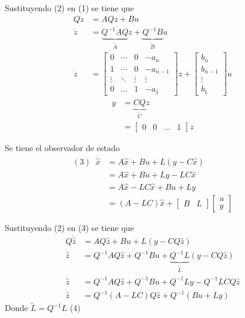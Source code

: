 Sustituyendo (2) en (1) se tiene que
\[
    \begin{split}
        Q\dot{z} & = AQz + Bu\\
        \dot{z} & = \underbrace{Q^{-1}AQ}_{\tilde{A}}z + \underbrace{Q^{-1}B}_{\tilde{B}}u\\
        \dot{z} & = 
            \begin{bmatrix}
                0 & \cdots & 0 & -a_{n} \\
                1 & \cdots & 0 & -a_{n-1} \\
                \vdots & \ddots & \vdots & \vdots \\
                0 & \ldots & 1 & -a_{1}
            \end{bmatrix} z +
            \begin{bmatrix}
                b_{n} \\ b_{n-1} \\ \vdots \\ b_{1}
            \end{bmatrix} u
    \end{split}
\]
\[
    \begin{split}
        y & = \underbrace{CQ}_{\tilde{C}}z \\
        & = \begin{bmatrix}
                0 & 0 & \ldots & 1
            \end{bmatrix} z
    \end{split}
\]

Se tiene el observador de estado
\[
    \begin{split}
        (3) \;\; \dot{\hat{x}} & = A\hat{x} + Bu + L(y-C\hat{x}) \\
        & = A\hat{x} + Bu + Ly - LC\hat{x} \\
        & = A\hat{x} - LC\hat{x} +Bu + Ly\\
        & = (A-LC)\hat{x} + \begin{bmatrix}B & L \end{bmatrix}\begin{bmatrix}   u\\ y \end{bmatrix}
    \end{split}
\]

Sustituyendo (2) en (3) se tiene que
\[
    \begin{split}
        Q\dot{\hat{z}} & = AQ\hat{z} + Bu + L(y-CQ\hat{z}) \\
        \dot{\hat{z}} & = Q^{-1}AQ\hat{z} + Q^{-1}Bu + \underbrace{Q^{-1}L}_{\tilde{L}}(y-CQ\hat{z}) \\
        \dot{\hat{z}} & = Q^{-1}AQ\hat{z} + Q^{-1}Bu + Q^{-1}Ly - Q^{-1}LCQ\hat{z} \\
        \dot{\hat{z}} & = Q^{-1}(A-LC)Q\hat{z} + Q^{-1}(Bu+Ly)
    \end{split}
\]
Donde \( \tilde{L} = Q^{-1}L \) (4)

